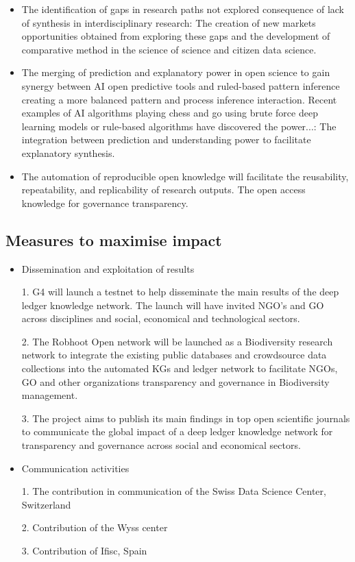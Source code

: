 \documentclass[12pt, a4paper]{article} %
\begin{document}
\begin{itemize}
\item The identification of gaps in research paths not explored
  consequence of lack of synthesis in interdisciplinary research: The
  creation of new markets opportunities obtained from exploring these
  gaps and the development of comparative method in the science of
  science and citizen data science.

\item The merging of prediction and explanatory power in open science
  to gain synergy between AI open predictive tools and ruled-based
  pattern inference creating a more balanced pattern and process
  inference interaction. Recent examples of AI algorithms playing
  chess and go using brute force deep learning models or rule-based
  algorithms have discovered the power...: The integration between
  prediction and understanding power to facilitate explanatory
  synthesis.

\item The automation of reproducible open knowledge will facilitate
  the reusability, repeatability, and replicability of research
  outputs. The open access knowledge for governance transparency.
  \end{itemize}

\subsection{Measures to maximise impact}

  \begin{itemize}
  \item Dissemination and exploitation of results

    1. G4 will launch a testnet to help disseminate the main results
    of the deep ledger knowledge network. The launch will have invited
    NGO’s and GO across disciplines and social, economical and
    technological sectors.

    2. The Robhoot Open network will be launched as a Biodiversity
    research network to integrate the existing public databases and
    crowdsource data collections into the automated KGs and ledger
    network to facilitate NGOs, GO and other organizations
    transparency and governance in Biodiversity management.

    3. The project aims to publish its main findings in top open
    scientific journals to communicate the global impact of a deep
    ledger knowledge network for transparency and governance across
    social and economical sectors.

\item Communication activities

  1. The contribution in communication of the Swiss Data Science Center, Switzerland

  2. Contribution of the Wyss center

  3. Contribution of Ifisc, Spain
\end{itemize}
\end{document}
